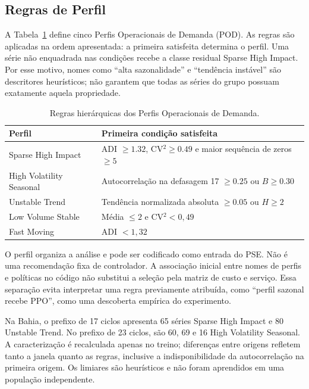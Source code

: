 \subsection{Regras de Perfil}

A Tabela~\ref{tab:pod} define cinco Perfis Operacionais de Demanda (POD). As regras são aplicadas na ordem apresentada: a primeira satisfeita determina o perfil. Uma série não enquadrada nas condições recebe a classe residual Sparse High Impact. Por esse motivo, nomes como ``alta sazonalidade'' e ``tendência instável'' são descritores heurísticos; não garantem que todas as séries do grupo possuam exatamente aquela propriedade.

\begin{table}[htbp]
\centering\small
\caption{Regras hierárquicas dos Perfis Operacionais de Demanda.}\label{tab:pod}
\begin{tabular}{lp{8cm}}
\toprule
Perfil & Primeira condição satisfeita\\
\midrule
Sparse High Impact & ADI $\geq1.32$, CV$^2\geq0.49$ e maior sequência de zeros $\geq5$\\
High Volatility Seasonal & Autocorrelação na defasagem 17 $\geq0.25$ ou $B\geq0.30$\\
Unstable Trend & Tendência normalizada absoluta $\geq0.05$ ou $H\geq2$\\
Low Volume Stable & Média $\leq2$ e CV$^2<0{,}49$\\
Fast Moving & ADI $<1{,}32$\\
\bottomrule
\end{tabular}
\end{table}

O perfil organiza a análise e pode ser codificado como entrada do PSE. Não é uma recomendação fixa de controlador. A associação inicial entre nomes de perfis e políticas no código não substitui a seleção pela matriz de custo e serviço. Essa separação evita interpretar uma regra previamente atribuída, como ``perfil sazonal recebe PPO'', como uma descoberta empírica do experimento.

Na Bahia, o prefixo de 17 ciclos apresenta 65 séries Sparse High Impact e 80 Unstable Trend. No prefixo de 23 ciclos, são 60, 69 e 16 High Volatility Seasonal. A caracterização é recalculada apenas no treino; diferenças entre origens refletem tanto a janela quanto as regras, inclusive a indisponibilidade da autocorrelação na primeira origem. Os limiares são heurísticos e não foram aprendidos em uma população independente.

